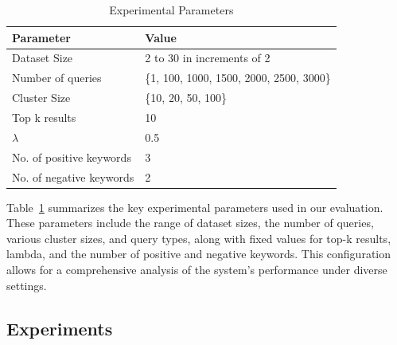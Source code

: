 \documentclass[conference]{IEEEtran}
\begin{document}
\begin{table}[!t]
\renewcommand{\arraystretch}{1.3}
\caption{Experimental Parameters}
\label{table:parameters}
\centering
\begin{tabular}{|l|l|}
\hline
\textbf{Parameter} & \textbf{Value} \\ \hline
Dataset Size & 2 to 30 in increments of 2 \\ \hline
Number of queries & \{1, 100, 1000, 1500, 2000, 2500, 3000\} \\ \hline
Cluster Size & \{10, 20, 50, 100\} \\ \hline
Top k results & 10 \\ \hline
\(\lambda\) & 0.5 \\ \hline
No. of positive keywords & 3 \\ \hline
No. of negative keywords & 2 \\ \hline
\end{tabular}
\end{table}
Table~\ref{table:parameters} summarizes the key experimental parameters used in our evaluation. These parameters include the range of dataset sizes, the number of queries, various cluster sizes, and query types, along with fixed values for top-k results, lambda, and the number of positive and negative keywords. This configuration allows for a comprehensive analysis of the system's performance under diverse settings.





\subsection{\textbf{Experiments}}
\end{document}
